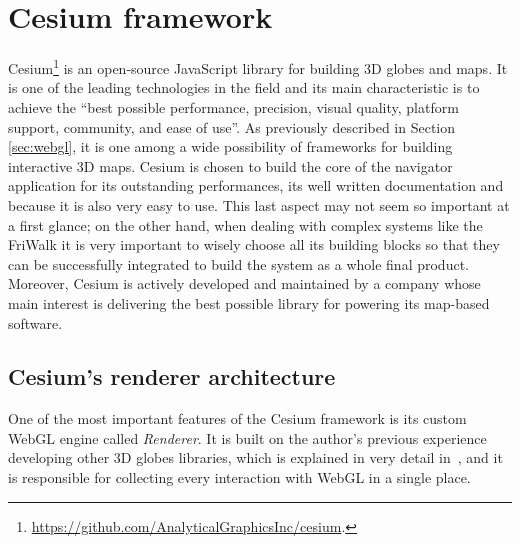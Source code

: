 \section{Cesium framework} \label{sec:cesium}
Cesium\footnote{\url{https://github.com/AnalyticalGraphicsInc/cesium}.} is an
open-source JavaScript library for building 3D globes and maps.
It is one of the leading technologies in the
field and its main characteristic is to achieve the ``best possible performance,
precision, visual quality, platform support, community, and ease of use''.
As previously described in Section \ref{sec:webgl}, it is one among a wide
possibility of frameworks for building interactive 3D maps. Cesium is chosen to
build the core of the navigator application for its outstanding performances,
its well written documentation and because it is also very easy to use. This last aspect
may not seem so important at a first glance; on the other hand, when dealing with
complex systems like the FriWalk it is very important to wisely choose all its building
blocks so that they can be successfully integrated to build the system as a whole
final product. Moreover, Cesium is actively developed and maintained by a company
whose main interest is delivering the best possible library for powering its
map-based software.

\subsection{Cesium's renderer architecture}
One of the most important features of the Cesium framework is its custom WebGL engine
called \emph{Renderer}.
It is built on the author's previous experience developing
other 3D globes libraries, which is explained in very detail in~\cite{cozzi20113d},
and it is responsible for collecting every interaction with WebGL in a single place.

